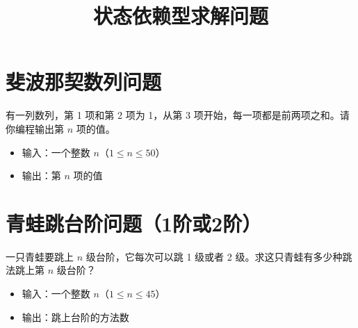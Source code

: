 \documentclass[11pt]{exam-zh}
\begin{document}
	
	\secret
	\title{状态依赖型求解问题}
	
	\maketitle
	
\section{斐波那契数列问题}

有一列数列，第 1 项和第 2 项为 1，从第 3 项开始，每一项都是前两项之和。请你编程输出第 $n$ 项的值。

\begin{itemize}[leftmargin=2em]
	\item 输入：一个整数 $n$（$1 \leq n \leq 50$）
	\item 输出：第 $n$ 项的值
\end{itemize}

\begin{center}
\end{center}


\section{青蛙跳台阶问题（1阶或2阶）}
一只青蛙要跳上 $n$ 级台阶，它每次可以跳 1 级或者 2 级。求这只青蛙有多少种跳法跳上第 $n$ 级台阶？

\begin{itemize}[leftmargin=2em]
	\item 输入：一个整数 $n$（$1 \leq n \leq 45$）
	\item 输出：跳上台阶的方法数
\end{itemize}
\end{document}
